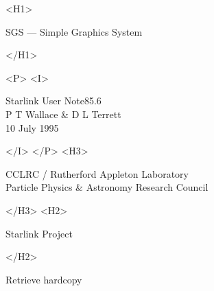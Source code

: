 \documentclass[11pt]{article}
\newcommand{\stardoccategory}  {Starlink User Note}
\newcommand{\stardocsource}    {sun85.6}
\newcommand{\stardocnumber}    {85.6}
\newcommand{\stardocauthors}   {P T Wallace \& D L Terrett}
\newcommand{\stardocdate}      {10 July 1995}
\newcommand{\stardoctitle}     {SGS --- Simple Graphics System}
\newcommand{\htmladdnormallink}[2]{#1}
\newcommand{\htmladdimg}[1]{}
\newcommand{\xlabel}[1]{}
\begin{document}
\begin{htmlonly}
   \xlabel{}
   \begin{rawhtml} <H1> \end{rawhtml}
      \stardoctitle
   \begin{rawhtml} </H1> \end{rawhtml}


   \begin{rawhtml} <P> <I> \end{rawhtml}
   \stardoccategory \stardocnumber \\
   \stardocauthors \\
   \stardocdate
   \begin{rawhtml} </I> </P> <H3> \end{rawhtml}
      \htmladdnormallink{CCLRC}{http://www.clrc.ac.uk} /
      \htmladdnormallink{Rutherford Appleton Laboratory}
                        {http://www.clrc.ac.uk/ral} \\
      Particle Physics \& Astronomy Research Council \\
   \begin{rawhtml} </H3> <H2> \end{rawhtml}
      \htmladdnormallink{Starlink Project}{http://star-www.rl.ac.uk/}
   \begin{rawhtml} </H2> \end{rawhtml}
   \htmladdnormallink{\htmladdimg{source.gif} Retrieve hardcopy}
      {http://star-www.rl.ac.uk/cgi-bin/hcserver?\stardocsource}\\


\end{htmlonly}
\end{document}

